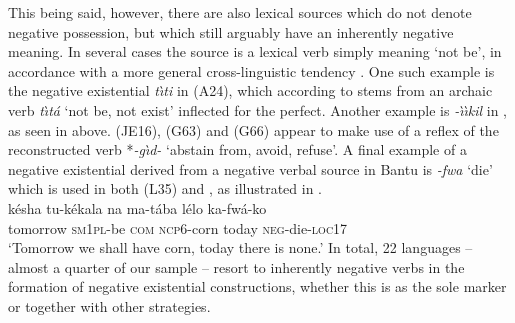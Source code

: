 \documentclass[output=paper]{langscibook}
\begin{document}
This being said, however, there are also lexical sources which do not
denote negative possession, but which still arguably have an inherently
negative meaning. In several cases the source is a lexical verb simply
meaning `not be', in accordance with a more general cross-linguistic
tendency %
%
\parencites(see)(){Veselinova2013b-Bantu}{Veselinova2016}. One such example
is the
negative existential \textit{t{\`\i}ti} in  (A24), which
according to \citet{Ittmann1939,Ittmann1976} stems from an archaic verb
\textit{t{\`\i}t{\'a}} `not be, not exist' inflected for the perfect.
Another example is \textit{-{\`\i}{\`\i}kil} in , as seen in
 above.  (JE16),  (G63) and
 (G66) appear to make use of a reflex of the
reconstructed verb *\textit{-g{\`\i}d-} `abstain from, avoid, refuse'. A
final example of a negative existential derived from a negative verbal
source in Bantu is \textit{-fwa} `die' which is used in both 
(L35) and , as illustrated in .
\ea\label{ex:kaonde-corn} \\ \gll k{\'e}sha tu-k{\'e}kala na ma-t{\'a}ba
l{\'e}lo ka-fw{\'a}-ko\\ tomorrow \textsc{sm1pl}-be \textsc{com}
\textsc{ncp}6-corn today \textsc{neg}-die-\textsc{loc}17\\ \glt `Tomorrow
we shall have corn, today there is none.' \z 
%
In total, 22 languages --
almost a quarter of our sample -- resort to inherently negative verbs in
the formation of negative existential constructions, whether this is as the
sole marker or together with other strategies.
\end{document}
